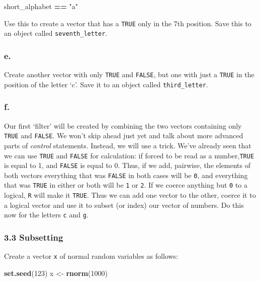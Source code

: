 \documentclass[]{article}
\newenvironment{Shaded}{\begin{snugshade}}{\end{snugshade}}
\newcommand{\DecValTok}[1]{\textcolor[rgb]{0.00,0.00,0.81}{#1}}
\newcommand{\KeywordTok}[1]{\textcolor[rgb]{0.13,0.29,0.53}{\textbf{#1}}}
\newcommand{\NormalTok}[1]{#1}
\newcommand{\OperatorTok}[1]{\textcolor[rgb]{0.81,0.36,0.00}{\textbf{#1}}}
\newcommand{\StringTok}[1]{\textcolor[rgb]{0.31,0.60,0.02}{#1}}
\begin{document}
\begin{Shaded}
\begin{Highlighting}[]
\NormalTok{short_alphabet }\OperatorTok{==}\StringTok{ "a"}
\end{Highlighting}
\end{Shaded}

Use this to create a vector that has a \texttt{TRUE} only in the 7th
position. Save this to an object called \texttt{seventh\_letter}.

\hypertarget{e.-3}{%
\subsubsection{e.}\label{e.-3}}

Create another vector with only \texttt{TRUE} and \texttt{FALSE}, but
one with just a \texttt{TRUE} in the position of the letter `c'. Save it
to an object called \texttt{third\_letter}.

\hypertarget{f.-2}{%
\subsubsection{f.}\label{f.-2}}

Our first `filter' will be created by combining the two vectors
containing only \texttt{TRUE} and \texttt{FALSE}. We won't skip ahead
just yet and talk about more advanced parts of \emph{control}
statements. Instead, we will use a trick. We've already seen that we can
use \texttt{TRUE} and \texttt{FALSE} for calculation: if forced to be
read as a number,\texttt{TRUE} is equal to 1, and \texttt{FALSE} is
equal to 0. Thus, if we add, pairwise, the elements of both vectors
everything that was \texttt{FALSE} in both cases will be \texttt{0}, and
everything that was \texttt{TRUE} in either or both will be \texttt{1}
or \texttt{2}. If we coerce anything but \texttt{0} to a logical,
\texttt{R} will make it \texttt{TRUE}. Thus we can add one vector to the
other, coerce it to a logical vector and use it to subset (or index) our
vector of numbers. Do this now for the letters \texttt{c} and
\texttt{g}.

\hypertarget{subsetting}{%
\subsubsection{3.3 Subsetting}\label{subsetting}}

Create a vector \texttt{x} of normal random variables as follows:

\begin{Shaded}
\begin{Highlighting}[]
\KeywordTok{set.seed}\NormalTok{(}\DecValTok{123}\NormalTok{)}
\NormalTok{x <-}\StringTok{ }\KeywordTok{rnorm}\NormalTok{(}\DecValTok{1000}\NormalTok{)}
\end{Highlighting}
\end{Shaded}
\end{document}
